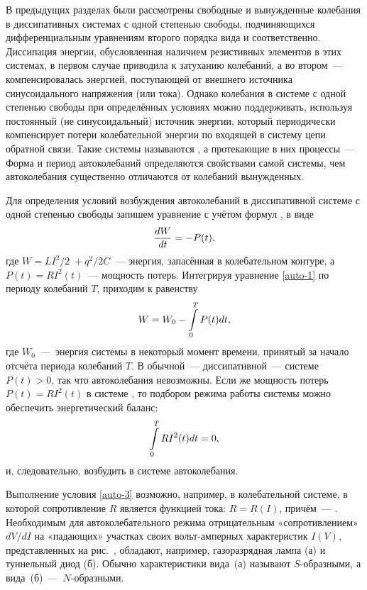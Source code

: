 
В предыдущих разделах были рассмотрены свободные и вынужденные колебания в диссипативных системах с одной степенью свободы, подчиняющихся дифференциальным уравнениям второго порядка вида  и  соответственно. Диссипация энергии, обусловленная наличием резистивных элементов в этих системах, в первом случае приводила к затуханию колебаний, а во втором~--- компенсировалась энергией, поступающей от
внешнего источника синусоидального напряжения (или тока). Однако колебания в системе с одной степенью свободы при определённых условиях можно поддерживать, используя постоянный (не синусоидальный) источник энергии, который периодически компенсирует потери колебательной энергии по входящей в систему цепи обратной связи. Такие системы называются , а протекающие в них процессы~---  Форма и период автоколебаний определяются свойствами самой системы, чем автоколебания существенно отличаются от колебаний вынужденных.

Для определения условий возбуждения автоколебаний в диссипативной системе с одной степенью свободы запишем уравнение  с учётом формул ,  в виде
\begin{equation}
	\eqmark{auto-1}
	\frac{dW}{dt}=-P(t),
\end{equation}
где $W={LI^2}/{2}\;+{q^2}/{2C}$~--- энергия, запасённая в колебательном контуре, а $P(t)=R{{I}^{2}}(t)$~--- мощность потерь. Интегрируя уравнение \eqref{auto-1} по периоду колебаний $T$, приходим к равенству
\begin{equation}
	\eqmark{auto-2}
	W=W_0-\int\limits_{0}^{T}P(t)dt,
\end{equation}
где $W_0$~---~энергия системы в некоторый момент времени, принятый за начало отсчёта периода колебаний $T$. В обычной~--- диссипативной~--- системе $P(t)>0$, так что автоколебания невозможны. Если же мощность потерь $P(t)=R{{I}^{2}}(t)$ в системе , то подбором режима работы системы можно обеспечить энергетический баланс:
\begin{equation}
	\eqmark{auto-3}
	\int\limits_{0}^{T}{R{{I}^{2}}(t)dt}=0,
\end{equation}
и, следовательно, возбудить в системе автоколебания.

Выполнение условия \eqref{auto-3} возможно, например, в  колебательной системе, в которой сопротивление $R$ является функцией тока: $R=R(I)$, причём~--- . Необходимым для
автоколебательного режима отрицательным «сопротивлением» ${dV}/{dI}$ на «падающих» участках своих вольт-амперных характеристик $I(V)$, представленных на рис.~, обладают, например, газоразрядная лампа (а) и туннельный диод (б). Обычно характеристики вида~(а) называют $S$-образными, а вида~(б)~---~$N$-образными.

